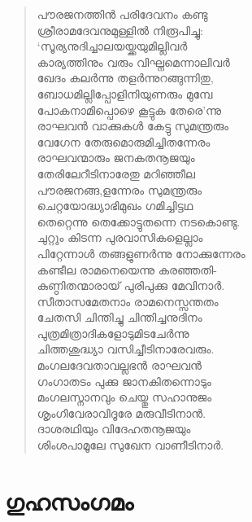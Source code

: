 \begin{verse}
പൗരജനത്തിന്‍ പരിദേവനം കണ്ടു\\
ശ്രീരാമദേവനുമുള്ളില്‍ നിരൂപിച്ചു:\\
‘സൂര്യനുദിച്ചാലയയ്ക്കയുമില്ലിവര്‍\\
കാര്യത്തിനും വരും വിഘ്നമെന്നാലിവര്‍\\
ഖേദം കലര്‍ന്നു തളര്‍ന്നുറങ്ങുന്നിതു,\\
ബോധമില്ലിപ്പോളിനിയുണരും മുമ്പേ\\
പോകനാമിപ്പൊഴെ കൂട്ടുക തേരെ’ന്നു\\
രാഘവന്‍ വാക്കുകള്‍ കേട്ടു സുമന്ത്രരും\\
വേഗേന തേരുമൊരുമിച്ചിതന്നേരം\\
രാഘവന്മാരും ജനകതനൂജയും\\
തേരിലേറീടിനാരേതു മറിഞ്ഞീല\\
പൗരജനങ്ങ,ളന്നേരം സുമന്ത്രരും\\
ചെറ്റയോദ്ധ്യാഭിമുഖം ഗമിച്ചിട്ടഥ\\
തെറ്റെന്നു തെക്കോട്ടുതന്നെ നടകൊണ്ടു.\\
ചുറ്റും കിടന്ന പുരവാസികളെല്ലാം\\
പിറ്റേന്നാള്‍ തങ്ങളുണര്‍ന്നു നോക്കുന്നേരം\\
കണ്ടീല രാമനെയെന്നു കരഞ്ഞതി-\\
കുണ്ഠിതന്മാരായ് പുരിപുക്കു മേവിനാര്‍.\\
സീതാസമേതനാം രാമനെസ്സന്തതം\\
ചേതസി ചിന്തിച്ചു ചിന്തിച്ചനുദിനം\\
പുത്രമിത്രാദികളോടുമിടചേര്‍ന്നു\\
ചിത്തശുദ്ധ്യാ വസിച്ചീടിനാരേവരും.\\
മംഗലദേവതാവല്ലഭന്‍ രാഘവന്‍\\
ഗംഗാതടം പുക്കു ജാനകിതന്നൊടും\\
മംഗലസ്നാനവും ചെയ്തു സഹാനുജം\\
ശൃംഗിവേരാവിദൂരേ മരുവീടിനാന്‍.\\
ദാശരഥിയും വിദേഹതനൂജയും\\
ശിംശപാമൂലേ സുഖേന വാണീടിനാര്‍.
\end{verse}


\section{ഗുഹസംഗമം}

